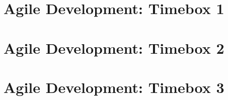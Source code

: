 \documentclass[preprint,11pt,review,authoryear]{elsarticle}
\begin{document}
\section{Agile Development: Timebox 1}
\renewcommand{\thepage}{L\arabic{page}}
\newpage
\section{Agile Development: Timebox 2}
\renewcommand{\thepage}{M\arabic{page}}
\newpage
\section{Agile Development: Timebox 3}
\renewcommand{\thepage}{N\arabic{page}}
\newpage
\end{document}
